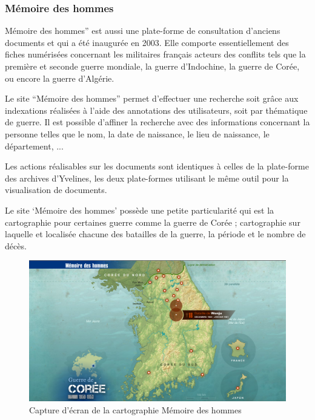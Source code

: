         \subsubsection{Mémoire des hommes}
        \label{subsubsec:memoire}
        Mémoire des hommes” est aussi une plate-forme de consultation d’anciens documents
        et qui a été inaugurée en 2003. Elle comporte essentiellement des fiches numérisées concernant
        les militaires français acteurs des conflits tels que la première et seconde guerre mondiale,
        la guerre d’Indochine, la guerre de Corée, ou encore la guerre d’Algérie.

        Le site “Mémoire des hommes” permet d’effectuer une recherche soit grâce aux indexations
        réalisées à l’aide des annotations des utilisateurs, soit par thématique de guerre.
        Il est possible d’affiner la recherche avec des informations concernant la personne telles que le nom,
        la date de naissance, le lieu de naissance, le département, ...

        Les actions réalisables sur les documents sont identiques à celles de la plate-forme
        des archives d’Yvelines, les deux plate-formes utilisant le même outil pour la visualisation
        de documents.

        Le site ‘Mémoire des hommes’ possède une petite particularité qui est la cartographie pour
        certaines guerre comme la guerre de Corée ; cartographie sur laquelle et localisée chacune
        des batailles de la guerre, la période et le nombre de décès.

        \begin{figure}[ht!]
            \centering
            \includegraphics[width=1\textwidth]{figure/screen_memoire_hommes.png}
            \caption{Capture d'écran de la cartographie Mémoire des hommes}
            \label{fig:memoire_hommes}
        \end{figure}

